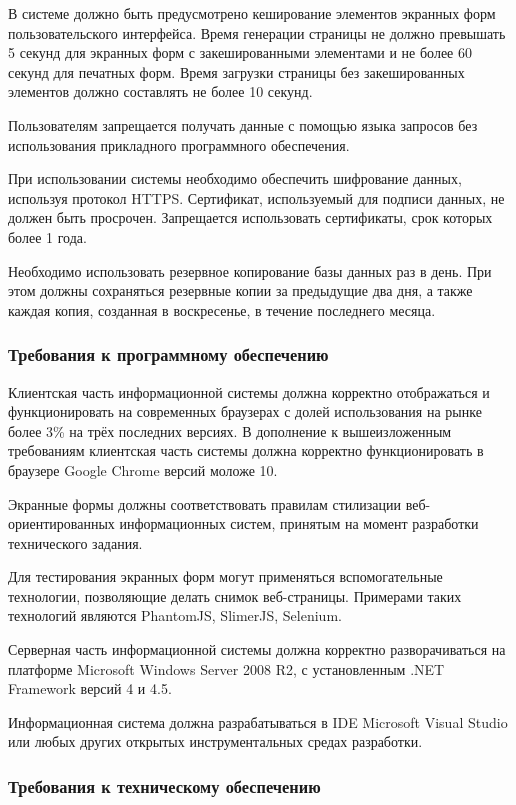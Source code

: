 В системе должно быть предусмотрено кеширование элементов экранных форм пользовательского интерфейса.
Время генерации страницы не должно превышать 5 секунд для экранных форм с закешированными элементами и не более 60 секунд для печатных форм.
Время загрузки страницы без закешированных элементов должно составлять не более 10 секунд.

Пользователям запрещается получать данные с помощью языка запросов без использования прикладного программного обеспечения.

При использовании системы необходимо обеспечить шифрование данных, используя протокол HTTPS.
Сертификат, используемый для подписи данных, не должен быть просрочен.
Запрещается использовать сертификаты, срок которых более 1 года.

Необходимо использовать резервное копирование базы данных раз в день.
При этом должны сохраняться резервные копии за предыдущие два дня, а также каждая копия, созданная в воскресенье, в течение последнего месяца.

\subsubsection{Требования к программному обеспечению}

Клиентская часть информационной системы должна корректно отображаться и функционировать на современных браузерах с долей использования на рынке более 3\% на трёх последних версиях.
В дополнение к вышеизложенным требованиям клиентская часть системы должна корректно функционировать в браузере Google Chrome версий моложе 10.

Экранные формы должны соответствовать правилам стилизации веб-ори\-ен\-ти\-ро\-ван\-ных информационных систем, принятым на момент разработки технического задания.

Для тестирования экранных форм могут применяться вспомогательные технологии, позволяющие делать снимок веб-страницы.
Примерами таких технологий являются PhantomJS, SlimerJS, Selenium.

Серверная часть информационной системы должна корректно разворачиваться на платформе Microsoft Windows Server 2008 R2,  с установленным .NET Framework версий 4 и 4.5.

Информационная система должна разрабатываться в IDE Microsoft Visual Studio или любых других открытых инструментальных средах разработки.

\subsubsection{Требования к техническому обеспечению}

